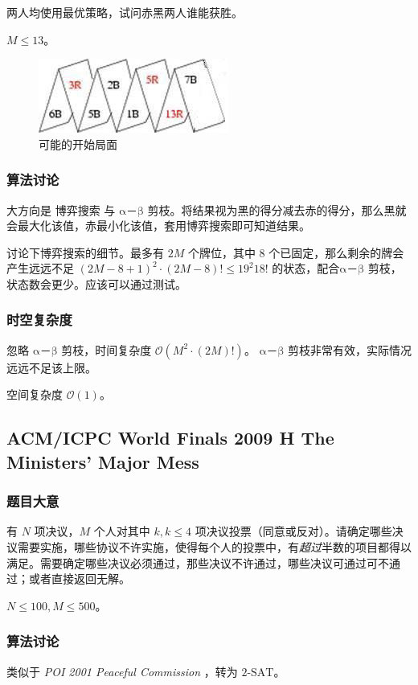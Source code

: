 				两人均使用最优策略，试问赤黑两人谁能获胜。
				
				$M \le 13$。
				\begin{figure}[htb]
					\centering
					\includegraphics[width=0.3 \textwidth]{10.png}
					\caption{可能的开始局面}\label{2009G}
				\end{figure}
				
			\subsubsection{算法讨论}
				大方向是 博弈搜索 与 $\mathrm{\alpha}$－$\mathrm{\beta}$ 剪枝。将结果视为黑的得分减去赤的得分，那么黑就会最大化该值，赤最小化该值，套用博弈搜索即可知道结果。
				
				讨论下博弈搜索的细节。最多有 $2M$ 个牌位，其中 $8$ 个已固定，那么剩余的牌会产生远远不足 $(2M - 8 + 1)^2 \cdot(2M - 8)! \le 19^2 18!$ 的状态，配合$\mathrm{\alpha}$－$\mathrm{\beta}$ 剪枝，状态数会更少。应该可以通过测试。
			
			\subsubsection{时空复杂度}
				忽略 $\mathrm{\alpha}$－$\mathrm{\beta}$ 剪枝，时间复杂度 $\mathcal{O}\left(M^2 \cdot (2M)!\right)$。 $\mathrm{\alpha}$－$\mathrm{\beta}$ 剪枝非常有效，实际情况远远不足该上限。
					
				空间复杂度 $\mathcal{O}\left(1\right)$。
		\newpage
		\subsection{ACM/ICPC World Finals 2009 H The Ministers’ Major Mess}
			\subsubsection{题目大意}
				有 $N$ 项决议，$M$ 个人对其中 $k, k \le 4$ 项决议投票（同意或反对）。请确定哪些决议需要实施，哪些协议不许实施，使得每个人的投票中，有\emph{超过}半数的项目都得以满足。需要确定哪些决议必须通过，那些决议不许通过，哪些决议可通过可不通过；或者直接返回无解。			
				
				$N \le 100, M \le 500$。
			\subsubsection{算法讨论}	
				类似于  \textit{POI 2001 Peaceful Commission }，转为 $2\text{-SAT}$。
				
